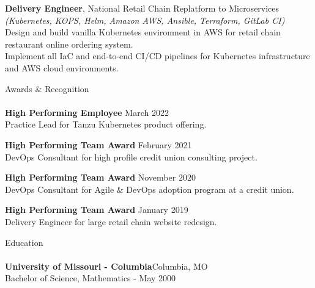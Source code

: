 \documentclass[letterpaper]{article}
\newcommand{\lineunder} {
    \vspace*{-8pt} \\
    \hspace*{-18pt} \hrulefill \\
}
\newcommand{\header} [1] {
    {\hspace*{-18pt}\vspace*{6pt} #1}
    \vspace*{-6pt} \lineunder
}
\begin{document}
{\textbf{Delivery Engineer}, National Retail Chain Replatform to Microservices} \nopagebreak \\
{\sl (Kubernetes, KOPS, Helm, Amazon AWS, Ansible, Terraform, GitLab CI)} \nopagebreak \\
Design and build vanilla Kubernetes environment in AWS for retail chain
  restaurant online ordering system.\\
Implement all IaC and end-to-end CI/CD pipelines for Kubernetes infrastructure
  and AWS cloud environments.\\
\vspace*{2mm}

\header{Awards \& Recognition}

\textbf{High Performing Employee} \hfill March 2022\\
\hspace*{5mm} Practice Lead for Tanzu Kubernetes product offering.\\
\vspace*{2mm}

\textbf{High Performing Team Award} \hfill February 2021\\
\hspace*{5mm} DevOps Consultant for high profile credit union consulting project.\\
\vspace*{2mm}

\textbf{High Performing Team Award} \hfill November 2020\\
\hspace*{5mm} DevOps Consultant for Agile \& DevOps adoption program at a credit union.\\
\vspace*{2mm}

\textbf{High Performing Team Award} \hfill January 2019\\
\hspace*{5mm} Delivery Engineer for large retail chain website redesign.\\
\vspace*{2mm}

\header{Education}
\textbf{University of Missouri - Columbia}\hfill Columbia, MO\\
Bachelor of Science, Mathematics \hfill  - May 2000\\
\vspace{2mm}
\end{document}
